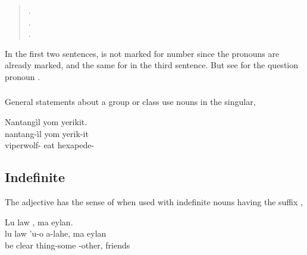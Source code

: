 \begin{quotation}
\noindent{} .\\
\noindent{} .\\
\noindent{} .
\end{quotation}

\noindent In the first two sentences,  is not marked for
number since the pronouns are already marked, and the same for
 in the third sentence.  But see 
for the question pronoun .

\subsubsection{} General statements about a group or class use nouns
in the singular,  

\begin{interlin}
\glll Nantangìl yom yerikit. \\
      nantang-ìl yom yerik-it \\
      viperwolf- eat hexapede- \\
 \Ipawl{}
\end{interlin}


\subsection{Indefinite} The adjective   has the sense
of  when used with indefinite nouns having the suffix ,

\begin{interlin}
\glll Lu law  , ma eylan. \\
      lu law 'u-o a-lahe, ma eylan \\
      be clear thing-some -other,  friends \\
 \Ipawl{}
\end{interlin}


